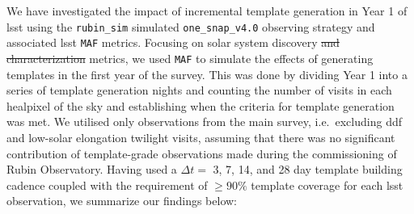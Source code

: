 \documentclass[preprintm,linenumbers]{aastex631}
\newcommand{\baseline}{\texttt{one\_snap\_v4.0}\xspace}
\newcommand{\rubinsim}{\texttt{rubin\_sim}\xspace}
\newcommand{\maf}{\texttt{MAF}\xspace}
\begin{document}
		We have investigated the impact of incremental template generation in Year 1 of \gls*{lsst} using the \rubinsim simulated \baseline observing strategy and associated \gls*{lsst} \maf metrics. %
  Focusing on solar system discovery \sout{and characterization} metrics, we used \maf to simulate the effects of generating templates in the first year of the survey.
  This was done by dividing Year 1 into a series of template generation nights and counting the number of visits in each healpixel of the sky and establishing when the criteria for template generation was met.
  We utilised only observations from the main survey, i.e.\ excluding \gls*{ddf} and low-solar elongation twilight visits, assuming that there was no significant contribution of template-grade observations made during the commissioning of Rubin Observatory. 
  Having used a $\Delta t = $ 3, 7, 14, and 28 day template building cadence coupled with the requirement of $\geq90\%$ template coverage for each \gls*{lsst} observation, we summarize our findings below:
		
\end{document}
